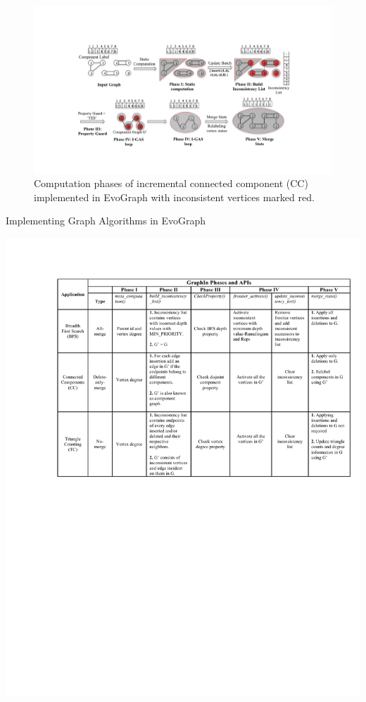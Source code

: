 \begin{figure}[!t]
\centering
\includegraphics[width=1\columnwidth]{figures/cc.pdf}
\caption{Computation phases of incremental connected component (CC) implemented in EvoGraph with inconsistent vertices marked red.}
\label{fig:cc}
\end{figure}

\begin{table}[!t] 
\caption{{Implementing Graph Algorithms in EvoGraph}} 
\label{tbl:table} 
\includegraphics[width=\textwidth,height=\textheight,keepaspectratio]{figures/Big-Table.pdf}
\end{table}

